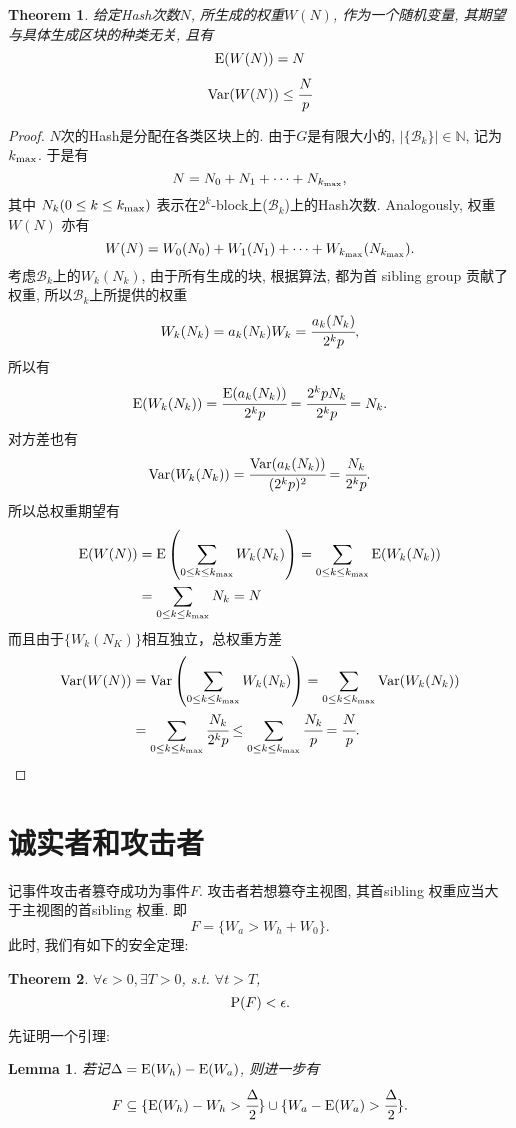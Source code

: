 \documentclass[UTF8]{ctexart}
\theoremstyle{definition}
\theoremstyle{plain}
\newtheorem{theorem}{Theorem}
\newtheorem{lemma}{Lemma}
\begin{document}
\begin{theorem}
    给定Hash次数$N$, 所生成的权重$W(N)$, 作为一个随机变量, 其期望与具体生成区块的种类无关, 且有
    \[ {\rm {E}}(W(N)) = N \]
    \[ {\rm {Var}}(W(N)) \leq \cfrac{N}{p}\]
    \label{weight}
\end{theorem}
\begin{proof}
    $N$次的Hash是分配在各类区块上的. 由于$G$是有限大小的, $|\{\mathcal{B}_k\}|\in \mathbb{N}$, 记为$k_{\rm max}$.
    于是有
    \[N = N_0 + N_1 + \dots + N_{k_{\rm max}},\] 其中 $N_k (0 \le k \le k_{\rm max})$ 表示在$2^k$-block上($\mathcal{B}_k$)上的Hash次数.
    Analogously, 权重$W(N)$ 亦有
    \[W(N) = W_0(N_0) + W_1(N_1) + \dots + W_{k_{\rm max}}(N_{k_{\rm max}}).\]
    考虑$\mathcal{B}_k$上的$W_k(N_k)$, 由于所有生成的块, 根据算法, 都为首 sibling group 贡献了权重, 所以$\mathcal{B}_k$上所提供的权重
    \[W_k(N_k) = a_k(N_k)W_k = \cfrac{a_k(N_k)}{2^k p},\]所以有
    \[{\rm E}(W_k(N_k))=\cfrac{{\rm E}(a_k(N_k))}{2^k p} = \cfrac{2^k p N_k}{2^k p} = N_k.\]
    对方差也有
    \[{\rm Var}(W_k(N_k))=\cfrac{{\rm Var}(a_k(N_k))}{(2^k p)^2} = \cfrac{N_k}{2^k p}.\]
    所以总权重期望有
    \begin{align*}
        {\rm {E}}(W(N)) &={\rm {E}}\left(\sum_{0 \le k \le k_{\rm max}} W_k(N_k)\right) =\sum_{0 \le k \le k_{\rm max}} {\rm {E}}(W_k(N_k))
        \\ &= \sum_{0 \le k \le k_{\rm max}}N_k = N
    \end{align*}
    而且由于$\{W_k(N_K)\}$相互独立，总权重方差
    \begin{align*}
        {\rm {Var}}(W(N)) &={\rm {Var}}\left(\sum_{0 \le k \le k_{\rm max}} W_k(N_k)\right) =\sum_{0 \le k \le k_{\rm max}} {\rm {Var}}(W_k(N_k))
        \\ &= \sum_{0 \le k \le k_{\rm max}}\cfrac{N_k}{2^k p} \leq \sum_{0 \le k \le k_{\rm max}}\cfrac{N_k}{p} = \cfrac{N}{p}.
    \end{align*}
\end{proof}

\section{诚实者和攻击者}
记事件攻击者篡夺成功为事件$F$. 攻击者若想篡夺主视图, 其首sibling 权重应当大于主视图的首sibling 权重. 
即\[F=\{W_a>W_h+W_0\}.\]
此时, 我们有如下的安全定理:
\begin{theorem}
    $\forall \epsilon>0, \exists T>0$, s.t. $\forall t>T$,
    \[{\rm P}(F) <\epsilon .\]
    \label{safethm}
\end{theorem}
先证明一个引理:
\begin{lemma}
    若记$\Delta = {\rm E}(W_h)-{\rm E}(W_a)$, 则进一步有
\[F\subseteq \{{\rm E}(W_h)-W_h>\cfrac{\Delta}{2}\} \cup \{W_a-{\rm E}(W_a)>\cfrac{\Delta}{2}\}.\]
\label{lem}
\end{lemma}
\end{document}
